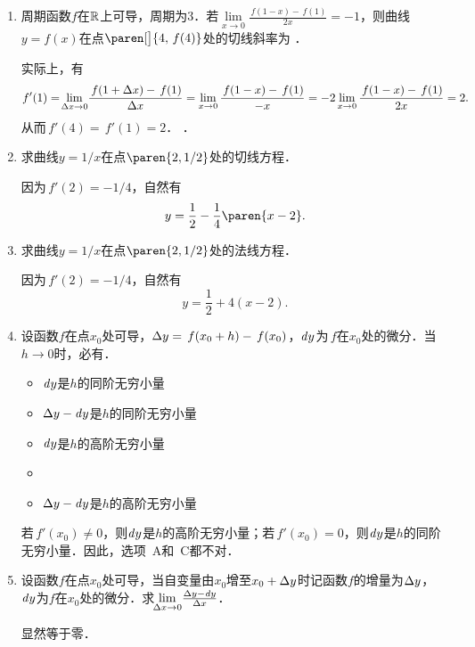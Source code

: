 \begin{enumerate}
\item 周期函数\(f\)在\(\mathbb{R}\)上可导，周期为\(3\)．若\(\lim\limits_{x\to0} \frac{\,f(1-x)-\,f(1)}{2x} = -1\)，则曲线\(y = f(x)\)在点\(\paren[\big]{4, \,f(4)}\)处的切线斜率为
  \ifshowsol
    \uline{}．

    实际上，有
    \begin{equation*}
      f'(1)
      = \!\lim_{\mathop{}\!\Delta x\to0} \!\frac{\,f(1+\mathop{}\!\Delta x) - \,f(1)}{\mathop{}\!\Delta x}
      = \lim_{x\to0} \frac{\,f(1-x) - \,f(1)}{-x}
      = -2 \lim_{x\to0} \frac{\,f(1-x)-\,f(1)}{2x}
      = 2.
    \end{equation*}
    从而\(\,f'(4) = \,f'(1) = 2\)．
  \else
    \uline{\hspace{4em}}．
  \fi

\item 求曲线\(y = 1/x\)在点\(\paren{2,1/2}\)处的切线方程．

  \ifshowsol
    因为\(\,f'(2) = -1/4\)，自然有
    \begin{equation*}
      y = \frac12 - \frac14 \paren{x-2}.
    \end{equation*}
  \fi

\item 求曲线\(y = 1/x\)在点\(\paren{2,1/2}\)处的法线方程．

  \ifshowsol
    因为\(\,f'(2) = -1/4\)，自然有
    \begin{equation*}
      y = \frac12 + 4(x-2).
    \end{equation*}
  \fi

\item 设函数\(f\)在点\(x_0\)处可导，\(\mathop{}\!\Delta y = \,f(x_0+h) - \,f(x_0)\)，\(\mathop{}\!\mathit{d} y\)为\(\,f\)在\(x_0\)处的微分．当\(h \to 0\)时，必有\uline{\hspace*{6em}}．
  \begin{itemize}
    \renewcommand{\labelitemi}{\faCircleThin}
  \item \(\mathop{}\!\mathit{d} y\)是\(h\)的同阶无穷小量
  \item \(\mathop{}\!\Delta y - \mathop{}\!\mathit{d} y\)是\(h\)的同阶无穷小量
  \item \(\mathop{}\!\mathit{d} y\)是\(h\)的高阶无穷小量
    \ifshowsol
    \item[\faCircle]
    \else
    \item
    \fi
    \(\mathop{}\!\Delta y - \mathop{}\!\mathit{d} y\)是\(h\)的高阶无穷小量
  \end{itemize}

  \ifshowsol
    若\(\,f'(x_0) \ne 0\)，则\(\mathop{}\!\mathit{d} y\)是\(h\)的高阶无穷小量；若\(\,f'(x_0) = 0\)，则\(\mathop{}\!\mathit{d} y\)是\(h\)的同阶无穷小量．因此，选项~A和~C都不对．
  \fi

\item 设函数\(f\)在点\(x_0\)处可导，当自变量由\(x_0\)增至\(x_0+\mathop{}\!\Delta y\)时记函数\(f\)的增量为\(\mathop{}\!\Delta y\)，\(\mathop{}\!\mathit{d} y\)为\(f\)在\(x_0\)处的微分．求\(\!\lim\limits_{\mathop{}\!\Delta x\to0} \!\frac{\mathop{}\!\Delta y - \mathop{}\!\mathit{d} y}{\mathop{}\!\Delta x}\)．

  \ifshowsol
    显然等于零．
  \fi
\end{enumerate}
\fi

